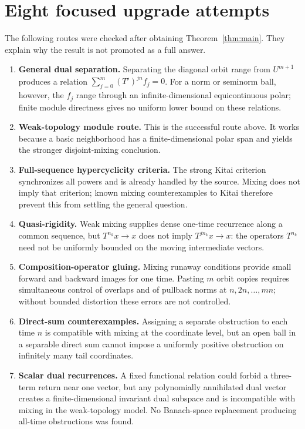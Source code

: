 \documentclass[11pt]{article}
\begin{document}
\section{Eight focused upgrade attempts}

The following routes were checked after obtaining Theorem~\ref{thm:main}.
They explain why the result is not promoted as a full answer.

\begin{enumerate}
\item \textbf{General dual separation.}  Separating the diagonal orbit range
from $U^{m+1}$ produces a relation
$\sum_{j=0}^m(T')^{jn}f_j=0$.  For a norm or seminorm ball, however, the
$f_j$ range through an infinite-dimensional equicontinuous polar; finite
module directness gives no uniform lower bound on these relations.

\item \textbf{Weak-topology module route.}  This is the successful route
above.  It works because a basic neighborhood has a finite-dimensional polar
span and yields the stronger disjoint-mixing conclusion.

\item \textbf{Full-sequence hypercyclicity criteria.}  The strong Kitai
criterion synchronizes all powers and is already handled by the source.
Mixing does not imply that criterion; known mixing counterexamples to Kitai
therefore prevent this from settling the general question.

\item \textbf{Quasi-rigidity.}  Weak mixing supplies dense one-time
recurrence along a common sequence, but $T^{n_k}x\to x$ does not imply
$T^{jn_k}x\to x$: the operators $T^{n_k}$ need not be uniformly bounded on
the moving intermediate vectors.

\item \textbf{Composition-operator gluing.}  Mixing runaway conditions
provide small forward and backward images for one time.  Pasting $m$ orbit
copies requires simultaneous control of overlaps and of pullback norms at
$n,2n,\ldots,mn$; without bounded distortion these errors are not controlled.

\item \textbf{Direct-sum counterexamples.}  Assigning a separate obstruction
to each time $n$ is compatible with mixing at the coordinate level, but an
open ball in a separable direct sum cannot impose a uniformly positive
obstruction on infinitely many tail coordinates.

\item \textbf{Scalar dual recurrences.}  A fixed functional relation could
forbid a three-term return near one vector, but any polynomially annihilated
dual vector creates a finite-dimensional invariant dual subspace and is
incompatible with mixing in the weak-topology model.  No Banach-space
replacement producing all-time obstructions was found.


\end{enumerate}
\end{document}
